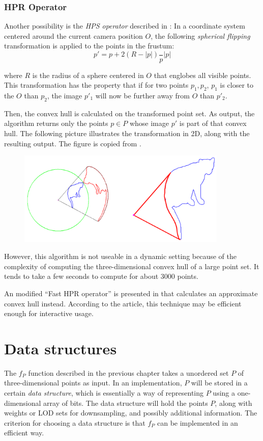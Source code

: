 \documentclass[a4paper,10pt,abstracton,notitlepage]{scrreprt}
\begin{document}
\subsection{HPR Operator}
Another possibility is the \emph{HPS operator} described in \cite{Katz2007}: In a coordinate system centered around the current camera position $O$, the following \emph{spherical flipping} transformation is applied to the points in the frustum:
\begin{equation}
	p' = p + 2(R - |p|) \frac{}{p}{|p|}
\end{equation}

where $R$ is the radius of a sphere centered in $O$ that englobes all visible points. This transformation has the property that if for two points $p_{1}, p_{2}$, $p_{1}$ is closer to the $O$ than $p_{2}$, the image $p'_{1}$ will now be further away from $O$ than $p'_{2}$.

Then, the convex hull is calculated on the transformed point set. As output, the algorithm returns only the points $p \in P$ whose image $p'$ is part of that convex hull. The following picture illustrates the transformation in 2D, along with the resulting output. The figure is copied from \cite{Kat2007}.

\begin{figure}[H]
\centering
	\includegraphics[width=10cm]{hpr.png}
\end{figure}

However, this algorithm is not useable in a dynamic setting because of the complexity of computing the three-dimensional convex hull of a large point set. It tends to take a few seconds to compute for about $3000$ points.

An modified ``Fast HPR operator'' is presented in \cite{Ren2012} that calculates an approximate convex hull instead. According to the article, this technique may be efficient enough for interactive usage.

\chapter{Data structures}
The $f_{P}$ function described in the previous chapter takes a unordered set $P$ of three-dimensional points as input. In an implementation, $P$ will be stored in a certain \emph{data structure}, which is essentially a way of representing $P$ using a one-dimensional array of bits. The data structure will hold the points $P$, along with weights or LOD sets for downsampling, and possibly additional information. The criterion for choosing a data structure is that $f_{P}$ can be implemented in an efficient way.
\end{document}
